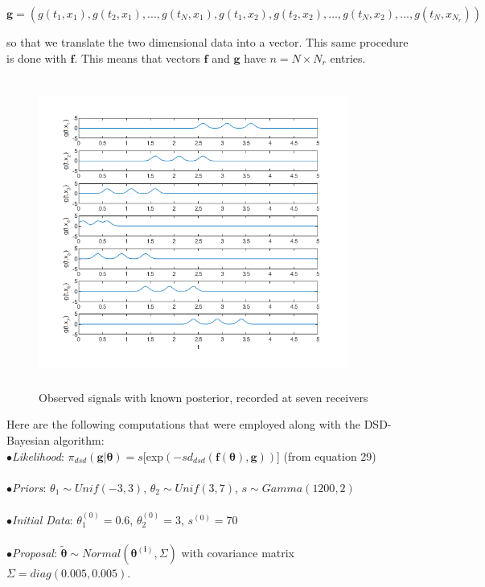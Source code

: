 \documentclass[botnum, fleqn]{unmeethesis}
\begin{document}
\begin{center}
 $\bm{g}=(g(t_1,x_1),g(t_2,x_1),...,g(t_N,x_1),g(t_1,x_2),g(t_2,x_2),...,g(t_N,x_2),...,g(t_N,x_{N_r}))$ 
 \end{center}
so that we translate the two dimensional data into a vector. This same procedure is done with $\bm{f}$. This means that vectors $\bm{f}$ and $\bm{g}$ have $n=N\times N_r$ entries.
\begin{figure}[H]
	\centering
	\includegraphics[width=4in,height=4in]{noiseData1.png}
    \caption{Observed signals with known posterior, recorded at seven receivers}
\end{figure}
\noindent Here are the following computations that were employed along with the DSD-Bayesian algorithm:\\
\indent $\bullet$\emph{Likelihood}: $\pi_{dsd}(\bm{g}|\bm{\theta})=s$[exp$(-sd_{dsd}(\bm{f}(\bm{\theta}),\bm{g}))$] (from equation 29)\\ \\
\indent $\bullet$\emph{Priors}: $\theta_1\sim Unif(-3,3)$, \hspace{0.5cm} $\theta_2\sim Unif(3,7)$, \hspace{0.5cm} $s\sim Gamma(1200,2)$ \\ \\
\overfullrule=0pt \indent $\bullet$\emph{Initial Data}: $\theta_1^{(0)}=0.6$, \hspace{0.5cm} $\theta_2^{(0)}=3$, \hspace{0.5cm} $s^{(0)}=70$\\\\
\indent $\bullet$\emph{Proposal}: $\widetilde{\bm{\theta}} \sim Normal(\bm{\theta^{(i)}},\Sigma)$ \indent with covariance matrix $\Sigma=diag(0.005,0.005)$.\\\\
\end{document}
